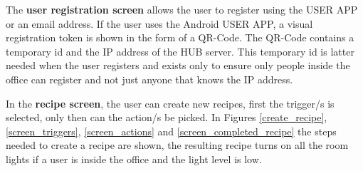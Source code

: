 The \textbf{user registration screen} allows the user to register using the USER APP or an email address.
If the user uses the Android USER APP, a visual registration token is shown in the form of a QR-Code. The QR-Code contains a temporary id and the IP address of the HUB server. This temporary id is latter needed when the user registers and exists  only to ensure only people inside the office can register and not just anyone that knows the IP address.

In the \textbf{recipe screen}, the user can create new recipes, first the trigger/s is selected, only then can the action/s be picked. In Figures \ref{create_recipe}, \ref{screen_triggers}, \ref{screen_actions} and \ref{screen_completed_recipe} the steps needed to create a recipe are shown, the resulting recipe turns on all the room lights if a user is inside the office and the light level is low. 


